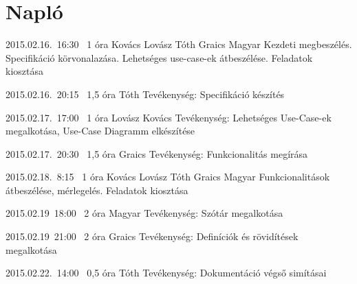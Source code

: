 %
\pagebreak
\section{Napló}

\begin{naplo}

\bejegyzes
{2015.02.16.~16:30~} %
{1 óra} %
{Kovács\newline
Lovász\newline
Tóth\newline
Graics\newline
Magyar
} %
{Kezdeti megbeszélés. Specifikáció körvonalazása. Lehetséges use-case-ek átbeszélése. Feladatok kiosztása} %

\bejegyzes
{2015.02.16.~20:15~}
{1,5 óra}
{Tóth}
{Tevékenység: Specifikáció készítés}

\bejegyzes
{2015.02.17.~17:00~}
{1 óra}
{Lovász\newline
Kovács}
{Tevékenység: Lehetséges Use-Case-ek megalkotása, Use-Case Diagramm elkészítése}

\bejegyzes
{2015.02.17.~20:30~}
{1,5 óra}
{Graics}
{Tevékenység: Funkcionalitás megírása}

\bejegyzes
{2015.02.18.~8:15~} %
{1 óra} %
{Kovács\newline
Lovász\newline
Tóth\newline
Graics\newline
Magyar
} %
{Funkcionalitások átbeszélése, mérlegelés. Feladatok kiosztása}


\bejegyzes
{2015.02.19~18:00~}
{2 óra}
{Magyar}
{Tevékenység: Szótár megalkotása}

\bejegyzes
{2015.02.19~21:00~}
{2 óra}
{Graics}
{Tevékenység: Definíciók és rövidítések megalkotása}

\bejegyzes
{2015.02.22.~14:00~}
{0,5 óra}
{Tóth}
{Tevékenység: Dokumentáció végső simításai}

\end{naplo}
